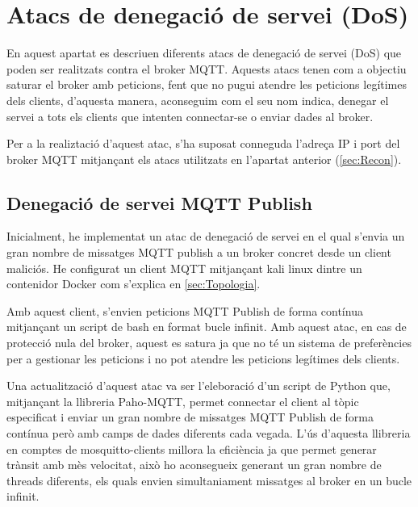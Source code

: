 \section{Atacs de denegació de servei (DoS)}

En aquest apartat es descriuen diferents atacs de denegació de servei (DoS) que poden ser realitzats contra el broker MQTT. Aquests atacs tenen com a objectiu saturar el broker amb peticions, fent que no pugui atendre les peticions legítimes dels clients, d'aquesta manera, aconseguim com el seu nom indica, denegar el servei a tots els clients que intenten connectar-se o enviar dades al broker.

Per a la realiztació d'aquest atac, s'ha suposat conneguda l'adreça IP i port del broker MQTT mitjançant els atacs utilitzats en l'apartat anterior (\ref{sec:Recon}).

\subsection{Denegació de servei MQTT Publish}

Inicialment, he implementat un atac de denegació de servei en el qual s'envia un gran nombre de missatges MQTT publish a un broker concret desde un client maliciós. He configurat un client MQTT mitjançant kali linux dintre un contenidor Docker com s'explica en \ref{sec:Topologia}.

Amb aquest client, s'envien peticions MQTT Publish de forma contínua mitjançant un script de bash en format bucle infinit. Amb aquest atac, en cas de protecció nula del broker, aquest es satura ja que no té un sistema de preferències per a gestionar les peticions i no pot atendre les peticions legítimes dels clients.

Una actualització d'aquest atac va ser l'eleboració d'un script de Python que, mitjançant la llibreria Paho-MQTT, permet connectar el client al tòpic especificat i enviar un gran nombre de missatges MQTT Publish de forma contínua però amb camps de dades diferents cada vegada. L'ús d'aquesta llibreria en comptes de mosquitto-clients millora la eficiència ja que permet generar trànsit amb mès velocitat, això ho aconsegueix generant un gran nombre de threads diferents, els quals envien simultaniament missatges al broker en un bucle infinit.

